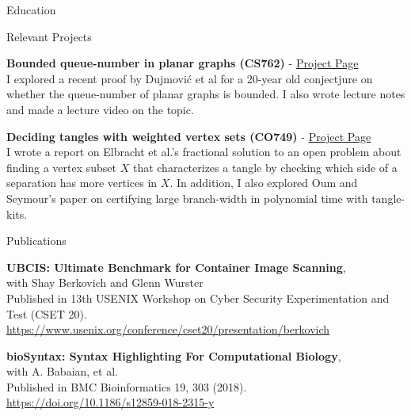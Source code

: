 \documentclass{cv}
\begin{document}
\begin{rSection}{Education}
\begin{rSubsection}{Relevant Projects}{}{}{}	
	\item \textbf{Bounded queue-number in planar graphs (CS762)} - \href{https://jeffreyhykam.com/writings/}{Project Page}\\
	I explored a recent proof by Dujmovi\'{c} et al \cite{queue} for a 20-year old conjectjure on whether the queue-number of planar graphs is bounded. I also wrote lecture notes and made a lecture video on the topic.\\

	\item \textbf{Deciding tangles with weighted vertex sets (CO749)} - \href{https://jeffreyhykam.com/writings/}{Project Page}\\
	I wrote a report on Elbracht et al.'s fractional solution \cite{tangle} to an open problem about finding a vertex subset $X$ that characterizes a tangle by checking which side of a separation has more vertices in $X$. In addition, I also explored Oum and Seymour's paper \cite{branchwidth} on certifying large branch-width in polynomial time with tangle-kits. 
\end{rSubsection}
\end{rSection}

\begin{rSection}{Publications}
\begin{rSubsectionPure}
	\item \textbf{{UBCIS}: Ultimate Benchmark for Container Image Scanning}, \\
	with Shay Berkovich and Glenn Wurster \\
	Published in 13th {USENIX} Workshop on Cyber Security Experimentation and Test ({CSET} 20). \\
	\href{https://www.usenix.org/conference/cset20/presentation/berkovich}{https://www.usenix.org/conference/cset20/presentation/berkovich}
\end{rSubsectionPure}

\begin{rSubsectionPure}
	\item \textbf{bioSyntax: Syntax Highlighting For Computational Biology}, \\
	with A. Babaian, et al. \\
	Published in BMC Bioinformatics 19, 303 (2018). \\
	\href{https://doi.org/10.1186/s12859-018-2315-y}{https://doi.org/10.1186/s12859-018-2315-y}
\end{rSubsectionPure}
\end{rSection}
\end{document}
